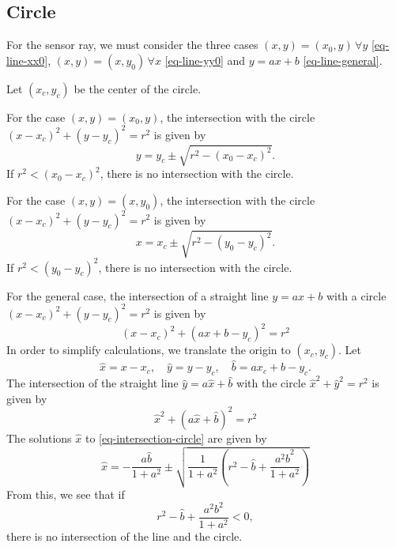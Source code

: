 \documentclass[11pt]{article}
\newcommand{\bhat}{{\hat{b}}}
\newcommand{\xhat}{{\hat{x}}}
\newcommand{\yhat}{{\hat{y}}}
\begin{document}
\subsection{Circle}
\label{sec-intersection-circle}
For the sensor ray, we must consider the three cases $(x,y)=(x_0,y)\,\forall y$
\eqref{eq-line-xx0}, $(x,y)=(x,y_0)\,\forall x$ \eqref{eq-line-yy0} and $y=ax+b$
\eqref{eq-line-general}.

Let $(x_c, y_c)$ be the center of the circle.

For the case $(x,y)=(x_0, y)$, the intersection with the circle
$(x-x_c)^2+(y-y_c)^2=r^2$ is given by
\begin{equation}
    y = y_c \pm\sqrt{r^2 - (x_0-x_c)^2}.
\end{equation}
If $r^2 < (x_0-x_c)^2$, there is no intersection with the circle.

For the case $(x,y)=(x, y_0)$, the intersection with the circle
$(x-x_c)^2+(y-y_c)^2=r^2$ is given by
\begin{equation}
    x = x_c \pm\sqrt{r^2 - (y_0-y_c)^2}.
\end{equation}
If $r^2 < (y_0-y_c)^2$, there is no intersection with the circle.

For the general case, the intersection of a
straight line $y=ax+b$ with a circle $(x-x_c)^2+(y-y_c)^2=r^2$ is given by
\begin{equation}
    (x-x_c)^2 + (ax+b - y_c)^2 = r^2
\end{equation}
In order to simplify calculations, we translate the origin to $(x_c, y_c)$. Let
\begin{equation}
    \xhat = x-x_c,\quad \yhat = y-y_c,\quad \bhat = ax_c + b - y_c.
\end{equation}
The intersection of the straight line $\yhat = a\xhat + \bhat$ with the circle
$\xhat^2 + \yhat^2 = r^2$ is given by
\begin{equation}
    \xhat^2 + (a\xhat + \bhat)^2 = r^2 \label{eq-intersection-circle}
\end{equation}
The solutions $\xhat$ to \eqref{eq-intersection-circle} are given by
\begin{equation}
    \xhat = -\frac{a\bhat}{1+a^2}\pm
        \sqrt{\frac{1}{1+a^2}\left(r^2-\bhat+\frac{a^2 \bhat^2}{1+a^2}\right)}
\end{equation}
From this, we see that if
\begin{equation}
    r^2-\bhat+\frac{a^2 b^2}{1+a^2} < 0,
\end{equation}
there is no intersection of the line and the circle.
\end{document}
